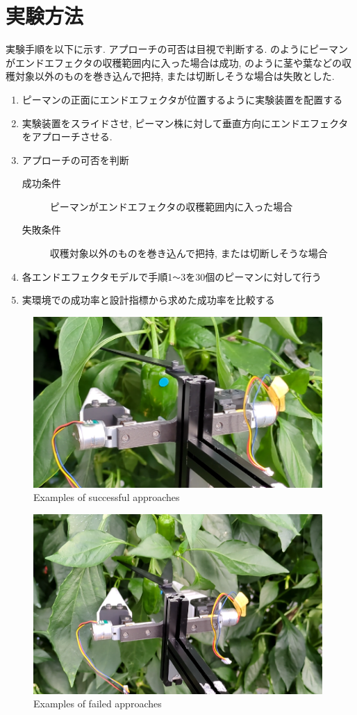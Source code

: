 \section{実験方法}
実験手順を以下に示す. アプローチの可否は目視で判断する.
のようにピーマンがエンドエフェクタの収穫範囲内に入った場合は成功, のように茎や葉などの収穫対象以外のものを巻き込んで把持, または切断しそうな場合は失敗とした.
\begin{enumerate}
  \item ピーマンの正面にエンドエフェクタが位置するように実験装置を配置する
  \item 実験装置をスライドさせ, ピーマン株に対して垂直方向にエンドエフェクタをアプローチさせる.
  \item アプローチの可否を判断
  \begin{description}
    \item[成功条件] ピーマンがエンドエフェクタの収穫範囲内に入った場合
    \item[失敗条件] 収穫対象以外のものを巻き込んで把持, または切断しそうな場合
  \end{description}
  \item 各エンドエフェクタモデルで手順1\verb|〜|3を30個のピーマンに対して行う
  \item 実環境での成功率と設計指標から求めた成功率を比較する
\end{enumerate}

\vspace{5mm}
\begin{figure}[H]
     \centering
     \includegraphics[width=110mm]{images/png/success.png}
     \caption{Examples of successful approaches}
     \label{Fig:success}
   \end{figure}

\begin{figure}[H]
    \centering
    \includegraphics[width=110mm]{images/png/failure.png}
    \caption{Examples of failed approaches}
    \label{Fig:failure}
  \end{figure}